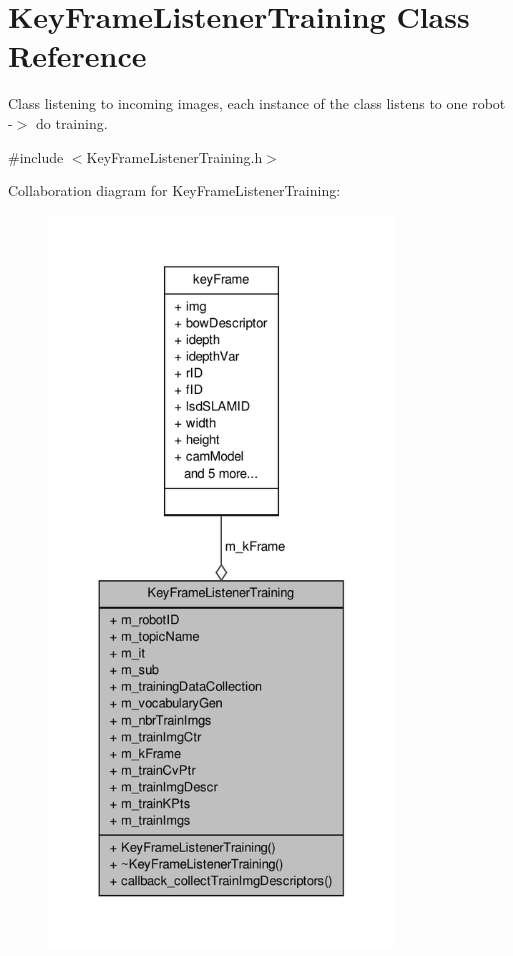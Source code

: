 \hypertarget{classKeyFrameListenerTraining}{\section{\-Key\-Frame\-Listener\-Training \-Class \-Reference}
\label{classKeyFrameListenerTraining}
}


\-Class listening to incoming images, each instance of the class listens to one robot -\/$>$ do training.  




{\ttfamily \#include $<$\-Key\-Frame\-Listener\-Training.\-h$>$}



\-Collaboration diagram for \-Key\-Frame\-Listener\-Training\-:\nopagebreak
\begin{figure}[H]
\begin{center}
\leavevmode
\includegraphics[height=550pt]{classKeyFrameListenerTraining__coll__graph}
\end{center}
\end{figure}
